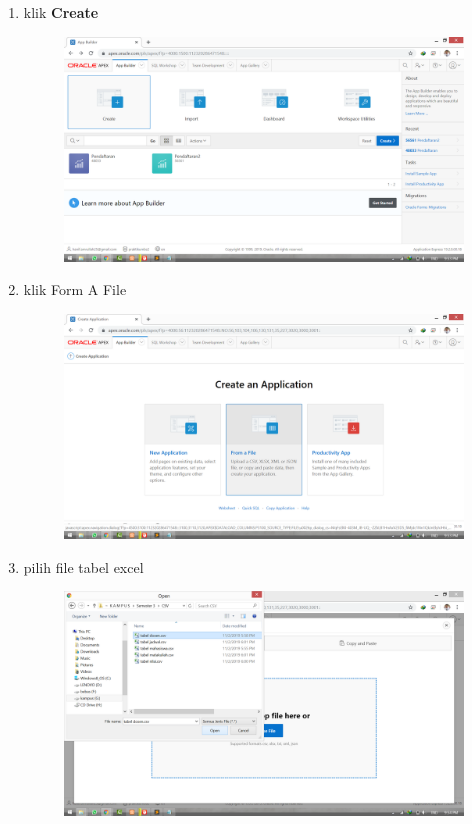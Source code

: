\documentclass[11pt]{article}
\begin{document}
\begin{enumerate}
\item klik \textbf{Create}
	\begin{figure}[h]
        \centerline{\includegraphics[scale=0.1]{img/3.png}}
        \centering
        \caption{}
		\label{langkah9}
		\end{figure}

\newpage
\item klik Form A File
	\begin{figure}[h]
        \centerline{\includegraphics[scale=0.1]{img/4.png}}
        \centering
        \caption{}
		\label{langkah10}
	\end{figure}


\item pilih file tabel excel
	\begin{figure}[h]
        \centerline{\includegraphics[scale=0.1]{img/5.png}}
        \centering
        \caption{}
		\label{langkah11}
	\end{figure}


\end{enumerate}
\end{document}
